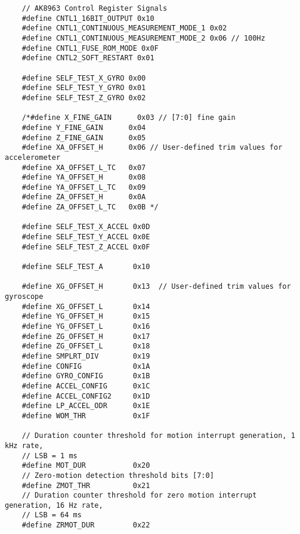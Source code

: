 \begin{lstlisting}
	// AK8963 Control Register Signals
	#define CNTL1_16BIT_OUTPUT 0x10
	#define CNTL1_CONTINUOUS_MEASUREMENT_MODE_1 0x02
	#define CNTL1_CONTINUOUS_MEASUREMENT_MODE_2 0x06 // 100Hz
	#define CNTL1_FUSE_ROM_MODE 0x0F
	#define CNTL2_SOFT_RESTART 0x01

	#define SELF_TEST_X_GYRO 0x00
	#define SELF_TEST_Y_GYRO 0x01
	#define SELF_TEST_Z_GYRO 0x02

	/*#define X_FINE_GAIN      0x03 // [7:0] fine gain
	#define Y_FINE_GAIN      0x04
	#define Z_FINE_GAIN      0x05
	#define XA_OFFSET_H      0x06 // User-defined trim values for accelerometer
	#define XA_OFFSET_L_TC   0x07
	#define YA_OFFSET_H      0x08
	#define YA_OFFSET_L_TC   0x09
	#define ZA_OFFSET_H      0x0A
	#define ZA_OFFSET_L_TC   0x0B */

	#define SELF_TEST_X_ACCEL 0x0D
	#define SELF_TEST_Y_ACCEL 0x0E
	#define SELF_TEST_Z_ACCEL 0x0F

	#define SELF_TEST_A       0x10

	#define XG_OFFSET_H       0x13  // User-defined trim values for gyroscope
	#define XG_OFFSET_L       0x14
	#define YG_OFFSET_H       0x15
	#define YG_OFFSET_L       0x16
	#define ZG_OFFSET_H       0x17
	#define ZG_OFFSET_L       0x18
	#define SMPLRT_DIV        0x19
	#define CONFIG            0x1A
	#define GYRO_CONFIG       0x1B
	#define ACCEL_CONFIG      0x1C
	#define ACCEL_CONFIG2     0x1D
	#define LP_ACCEL_ODR      0x1E
	#define WOM_THR           0x1F

	// Duration counter threshold for motion interrupt generation, 1 kHz rate,
	// LSB = 1 ms
	#define MOT_DUR           0x20
	// Zero-motion detection threshold bits [7:0]
	#define ZMOT_THR          0x21
	// Duration counter threshold for zero motion interrupt generation, 16 Hz rate,
	// LSB = 64 ms
	#define ZRMOT_DUR         0x22


\end{lstlisting}
